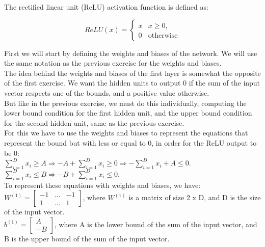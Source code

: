 \documentclass{article}
\begin{document}
The rectified linear unit (ReLU) activation function is defined as:

\[ 
    ReLU(x) = 
    \begin{cases}
        x & x \geq 0, \\
        0 & \text{otherwise}
    \end{cases}
\]

First we will start by defining the weights and biases of the network. We will use the same notation as the previous 
exercise for the weights and biases. \\

The idea behind the weights and biases of the first layer is somewhat the opposite of the first exercise. We want the hidden units to output 0
if the sum of the input vector respects one of the bounds, and a positive value otherwise. \\
But like in the previous exercise, we must do this individually, computing the lower bound condition for the first hidden unit, 
and the upper bound condition for the second hidden unit, same as the previous exercise. \\

For this we have to use the weights and biases to represent the equations that represent the bound but with less or equal to 0, in order for
the ReLU output to be 0: \\

$ \sum_{i=1}^{D} x_i \geq A \Rightarrow -A + \sum_{i=1}^{D} x_i \geq 0 \Rightarrow -\sum_{i=1}^{D} x_i + A \leq 0$. \\
$ \sum_{i=1}^{D} x_i \leq B \Rightarrow -B + \sum_{i=1}^{D} x_i \leq 0$. \\

To represent these equations with weights and biases, we have: \\

\( W^{(1)} = \begin{bmatrix}
    -1 & ...  & -1\\
    1 & ... & 1
\end{bmatrix}
\), where \(W^{(1)}\) is a matrix of size 2 x D, and D is the size of the input vector. \\

\(b^{(1)} = \begin{bmatrix}
    A\\
    -B
\end{bmatrix}
\), where A is the lower bound of the sum of the input vector, and B is the upper bound of the sum of the input vector. \\
\end{document}
